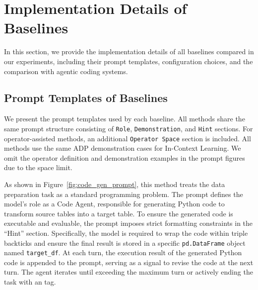 
\section{Implementation Details of Baselines}
\label{sec:appendix_baselines}

In this section, we provide the implementation details of all baselines compared in our experiments, including their prompt templates, configuration choices, and the comparison with agentic coding systems.

\subsection{Prompt Templates of Baselines}
\label{subsec:prompts_of_baselines}

We present the prompt templates used by each baseline. All methods share the same prompt structure consisting of \texttt{Role}, \texttt{Demonstration}, and \texttt{Hint} sections. For operator-assisted methods, an additional \texttt{Operator Space} section is included. All methods use the same ADP demonstration cases for In-Context Learning. We omit the operator definition and demonstration examples in the prompt figures due to the space limit.











As shown in Figure~\ref{fig:code_gen_prompt}, this method treats the data preparation task as a standard programming problem.
The prompt defines the model's role as a Code Agent, responsible for generating Python code to transform source tables into a target table. To ensure the generated code is executable and evaluable, the prompt imposes strict formatting constraints in the ``Hint'' section. Specifically, the model is required to wrap the code within triple backticks and ensure the final result is stored in a specific \texttt{pd.DataFrame} object named \texttt{target\_df}.
At each turn, the execution result of the generated Python code is appended to the prompt, serving as a signal to revise the code at the next turn. The agent iterates until exceeding the maximum turn or actively ending the task with an  tag.

